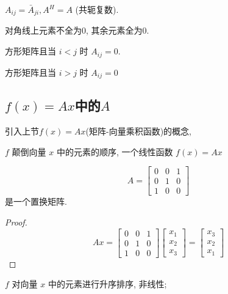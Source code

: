 \begin{definition}
    $ A_{i j}=\bar{A}_{j i}, A^H = A $ (共轭复数).
\end{definition}

\begin{definition}
    对角线上元素不全为0, 其余元素全为0.
\end{definition}

\begin{definition}[下三角矩阵]
    方形矩阵且当 $ i<j $ 时 $ A_{i j}=0 $.
\end{definition}

\begin{definition}[上三角矩阵]
    方形矩阵且当 $ i>j $ 时 $ A_{i j}=0 $
\end{definition}

\subsection{$f(x)=A x$中的$A$}

引入上节$f(x)=A x$(矩阵-向量乘积函数)的概念,

\begin{example}
    $ f $ 颠倒向量 $ x $ 中的元素的顺序, 一个线性函数 $ f(x)=A x $

    $$ A=\left[\begin{array}{lll}0 & 0 & 1 \\ 0 & 1 & 0 \\ 1 & 0 & 0\end{array}\right] $$是一个置换矩阵.
\end{example}

\begin{proof}
    $$ A x=\left[\begin{array}{lll}0 & 0 & 1 \\ 0 & 1 & 0 \\ 1 & 0 & 0\end{array}\right]\left[\begin{array}{l}x_{1} \\ x_{2} \\ x_{3}\end{array}\right]=\left[\begin{array}{l}x_{3} \\ x_{2} \\ x_{1}\end{array}\right] $$
\end{proof}

\begin{example}
    $ f $ 对向量 $ x $ 中的元素进行升序排序, 非线性;
\end{example}


